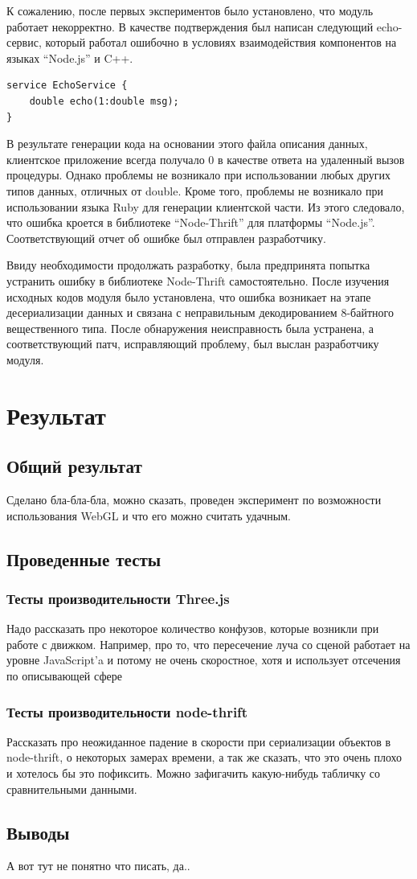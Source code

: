 \documentclass[12pt, a4paper]{article}
\let\stdsection\section
\renewcommand\section{\newpage\stdsection}
\begin{document}
К сожалению, после первых экспериментов было установлено, что модуль работает
некорректно. В качестве подтверждения был написан следующий echo-сервис, который
работал ошибочно в условиях взаимодействия компонентов на языках ``Node.js'' и
C++.

\begin{lstlisting}
service EchoService {
    double echo(1:double msg);
}
\end{lstlisting}

В результате генерации кода на основании этого файла описания данных,
клиентское приложение всегда получало 0 в качестве ответа на удаленный
вызов процедуры. Однако проблемы не возникало при использовании любых других
типов данных, отличных от double. Кроме того, проблемы не возникало при
использовании языка Ruby для генерации клиентской части. Из этого следовало, что
ошибка кроется в библиотеке ``Node-Thrift'' для платформы ``Node.js''.
Соответствующий отчет об ошибке был отправлен разработчику.

Ввиду необходимости продолжать разработку, была предпринята попытка устранить
ошибку в библиотеке Node-Thrift самостоятельно. После изучения исходных
кодов модуля было установлена, что ошибка возникает на этапе десериализации
данных и связана с неправильным декодированием 8-байтного вещественного типа.
После обнаружения неисправность была устранена, а соответствующий патч,
исправляющий проблему, был выслан разработчику модуля.

\section{Результат}
\subsection{Общий результат}
Сделано бла-бла-бла, можно сказать, проведен эксперимент по возможности
использования WebGL и что его можно считать удачным.
\subsection{Проведенные тесты}
\subsubsection{Тесты производительности Three.js}
Надо рассказать про некоторое количество конфузов, которые возникли при работе
с движком. Например, про то, что пересечение луча со сценой работает на уровне
JavaScript'a и потому не очень скоростное, хотя и использует отсечения по
описывающей сфере
\subsubsection{Тесты производительности node-thrift}
Рассказать про неожиданное падение в скорости при сериализации объектов в
node-thrift, о некоторых замерах времени, а так же сказать, что это очень плохо
и хотелось бы это пофиксить. Можно зафигачить какую-нибудь табличку со
сравнительными данными.
\subsection{Выводы}
А вот тут не понятно что писать, да..
\end{document}
